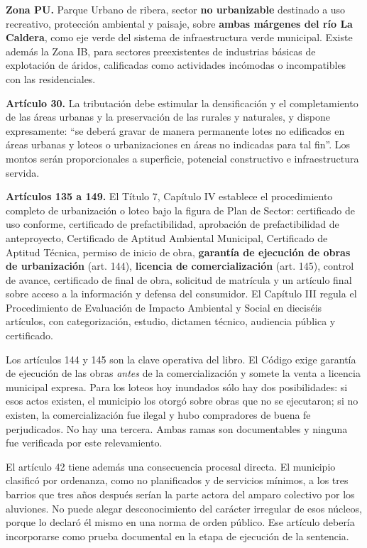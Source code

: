 \textbf{Zona PU.} Parque Urbano de ribera, sector \textbf{no urbanizable} destinado a uso recreativo, protección ambiental y paisaje, sobre \textbf{ambas márgenes del río La Caldera}, como eje verde del sistema de infraestructura verde municipal. Existe además la Zona IB, para sectores preexistentes de industrias básicas de explotación de áridos, calificadas como actividades incómodas o incompatibles con las residenciales.

\textbf{Artículo 30.} La tributación debe estimular la densificación y el completamiento de las áreas urbanas y la preservación de las rurales y naturales, y dispone expresamente: ``se deberá gravar de manera permanente lotes no edificados en áreas urbanas y loteos o urbanizaciones en áreas no indicadas para tal fin''. Los montos serán proporcionales a superficie, potencial constructivo e infraestructura servida.

\textbf{Artículos 135 a 149.} El Título 7, Capítulo IV establece el procedimiento completo de urbanización o loteo bajo la figura de Plan de Sector: certificado de uso conforme, certificado de prefactibilidad, aprobación de prefactibilidad de anteproyecto, Certificado de Aptitud Ambiental Municipal, Certificado de Aptitud Técnica, permiso de inicio de obra, \textbf{garantía de ejecución de obras de urbanización} (art. 144), \textbf{licencia de comercialización} (art. 145), control de avance, certificado de final de obra, solicitud de matrícula y un artículo final sobre acceso a la información y defensa del consumidor. El Capítulo III regula el Procedimiento de Evaluación de Impacto Ambiental y Social en dieciséis artículos, con categorización, estudio, dictamen técnico, audiencia pública y certificado.

\begin{cautela}
Los artículos 144 y 145 son la clave operativa del libro. El Código exige garantía de ejecución de las obras \textit{antes} de la comercialización y somete la venta a licencia municipal expresa. Para los loteos hoy inundados sólo hay dos posibilidades: si esos actos existen, el municipio los otorgó sobre obras que no se ejecutaron; si no existen, la comercialización fue ilegal y hubo compradores de buena fe perjudicados. No hay una tercera. Ambas ramas son documentables y ninguna fue verificada por este relevamiento.

El artículo 42 tiene además una consecuencia procesal directa. El municipio clasificó por ordenanza, como no planificados y de servicios mínimos, a los tres barrios que tres años después serían la parte actora del amparo colectivo por los aluviones. No puede alegar desconocimiento del carácter irregular de esos núcleos, porque lo declaró él mismo en una norma de orden público. Ese artículo debería incorporarse como prueba documental en la etapa de ejecución de la sentencia.
\end{cautela}

